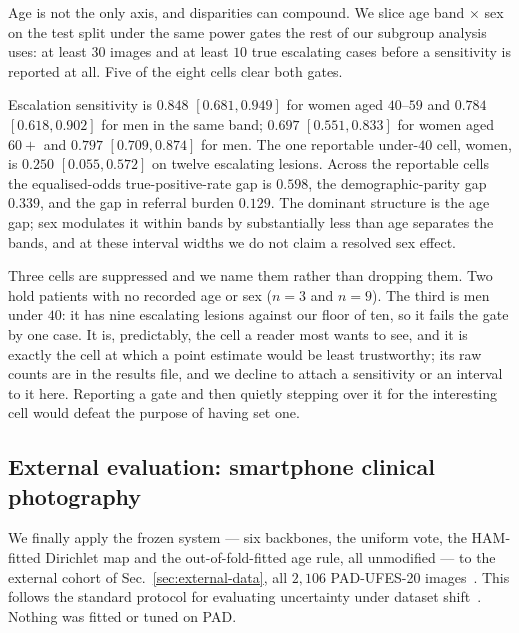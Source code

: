 \documentclass[journal]{IEEEtran}
\begin{document}
Age is not the only axis, and disparities can compound. We slice age band $\times$ sex on the
test split under the same power gates the rest of our subgroup analysis uses: at least $30$
images and at least $10$ true escalating cases before a sensitivity is reported at all. Five
of the eight cells clear both gates.

Escalation sensitivity is $0.848$ $[0.681, 0.949]$ for women aged $40$--$59$ and $0.784$
$[0.618, 0.902]$ for men in the same band; $0.697$ $[0.551, 0.833]$ for women aged $60+$ and
$0.797$ $[0.709, 0.874]$ for men. The one reportable under-$40$ cell, women, is $0.250$
$[0.055, 0.572]$ on twelve escalating lesions. Across the reportable cells the
equalised-odds true-positive-rate gap is $0.598$, the demographic-parity gap $0.339$, and the
gap in referral burden $0.129$. The dominant structure is the age gap; sex modulates it
within bands by substantially less than age separates the bands, and at these interval widths
we do not claim a resolved sex effect.

Three cells are suppressed and we name them rather than dropping them. Two hold patients with
no recorded age or sex ($n=3$ and $n=9$). The third is men under $40$: it has nine escalating
lesions against our floor of ten, so it fails the gate by one case. It is, predictably, the
cell a reader most wants to see, and it is exactly the cell at which a point estimate would be
least trustworthy; its raw counts are in the results file, and we decline to attach a
sensitivity or an interval to it here. Reporting a gate and then quietly stepping over it for
the interesting cell would defeat the purpose of having set one.

\subsection{External evaluation: smartphone clinical photography}
\label{sec:results-external}



We finally apply the frozen system --- six backbones, the uniform vote, the HAM-fitted
Dirichlet map and the out-of-fold-fitted age rule, all unmodified --- to the external cohort
of Sec.~\ref{sec:external-data}, all $2{,}106$ PAD-UFES-20
images~\cite{pacheco2020padufes}. This follows the standard protocol for
evaluating uncertainty under dataset shift~\cite{ovadia2019shift,
lakshminarayanan2017deepensembles}. Nothing was fitted or tuned on PAD.
\end{document}

